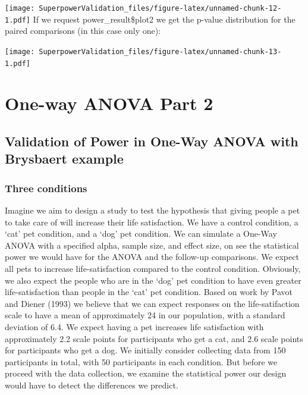 \documentclass[]{book}
\newenvironment{Shaded}{\begin{snugshade}}{\end{snugshade}}
\newcommand{\NormalTok}[1]{#1}
\newcommand{\OperatorTok}[1]{\textcolor[rgb]{0.81,0.36,0.00}{\textbf{#1}}}
\begin{document}
\begin{Shaded}
\end{Shaded}

\texttt{[image: SuperpowerValidation\_files/figure-latex/unnamed-chunk-12-1.pdf]}
If we request power\_result\$plot2 we get the p-value distribution for the paired comparisons (in this case only one):

\begin{Shaded}
\end{Shaded}

\texttt{[image: SuperpowerValidation\_files/figure-latex/unnamed-chunk-13-1.pdf]}

\hypertarget{one-way-anova-part-2}{%
\chapter{One-way ANOVA Part 2}\label{one-way-anova-part-2}}

\hypertarget{validation-of-power-in-one-way-anova-with-brysbaert-example}{%
\section{Validation of Power in One-Way ANOVA with Brysbaert example}\label{validation-of-power-in-one-way-anova-with-brysbaert-example}}

\hypertarget{three-conditions}{%
\subsection{Three conditions}\label{three-conditions}}

Imagine we aim to design a study to test the hypothesis that giving people a pet to take care of will increase their life satisfaction. We have a control condition, a `cat' pet condition, and a `dog' pet condition. We can simulate a One-Way ANOVA with a specified alpha, sample size, and effect size, on see the statistical power we would have for the ANOVA and the follow-up comparisons. We expect all pets to increase life-satisfaction compared to the control condition. Obviously, we also expect the people who are in the `dog' pet condition to have even greater life-satisfaction than people in the `cat' pet condition. Based on work by Pavot and Diener (1993) we believe that we can expect responses on the life-satifaction scale to have a mean of approximately 24 in our population, with a standard deviation of 6.4. We expect having a pet increases life satisfaction with approximately 2.2 scale points for participants who get a cat, and 2.6 scale points for participants who get a dog. We initially consider collecting data from 150 participants in total, with 50 participants in each condition. But before we proceed with the data collection, we examine the statistical power our design would have to detect the differences we predict.
\end{document}
